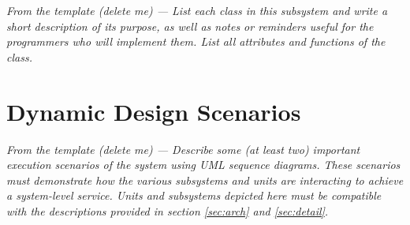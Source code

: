 \documentclass[12pt]{article}
\begin{document}
\textit {From the template (delete me) --- List each class in this subsystem and write a short description of its purpose, as well as notes or reminders useful for the programmers who will implement them. List all attributes and functions of the class.}

\section{Dynamic Design Scenarios}

\textit {From the template (delete me) --- Describe some (at least two) important execution scenarios of the system using UML sequence diagrams. These scenarios must demonstrate how the various subsystems and units are interacting to achieve a system-level service. Units and subsystems depicted here must be compatible with the descriptions provided in section \ref{sec:arch} and \ref{sec:detail}.}
\end{document}
